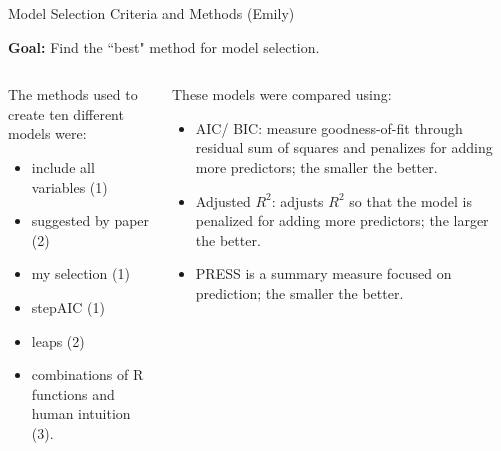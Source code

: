 \documentclass[table]{beamer}\usepackage[]{graphicx}\usepackage[]{color}
\begin{document}
\begin{frame}{Model Selection Criteria and Methods (Emily)}

\begin{center}
\textbf{Goal:} Find the ``best" method for model selection.\\
\end{center}

\begin{columns}[c] %
\begin{column}[c]{5cm} %
The methods used to create ten different models were:
\begin{itemize}
\item include all variables (1)\\
\item suggested by paper (2)\\
\item my selection (1)\\
\item stepAIC (1) \\
\item leaps (2) \\
\item combinations of R functions and human intuition (3).  \\
\end{itemize}

\end{column}

\begin{column}[c]{7cm} 

These models were compared using: \\
\begin{itemize}
\item AIC/ BIC: measure goodness-of-fit through residual sum of squares and penalizes for adding more predictors; the smaller the better.\\
\item Adjusted $R^2$: adjusts $R^2$ so that the model is penalized for adding more predictors; the larger the better. \\
\item PRESS is a summary measure focused on prediction; the smaller the better.\\
\end{itemize}
\end{column}
\end{columns}
\end{frame}
\end{document}
